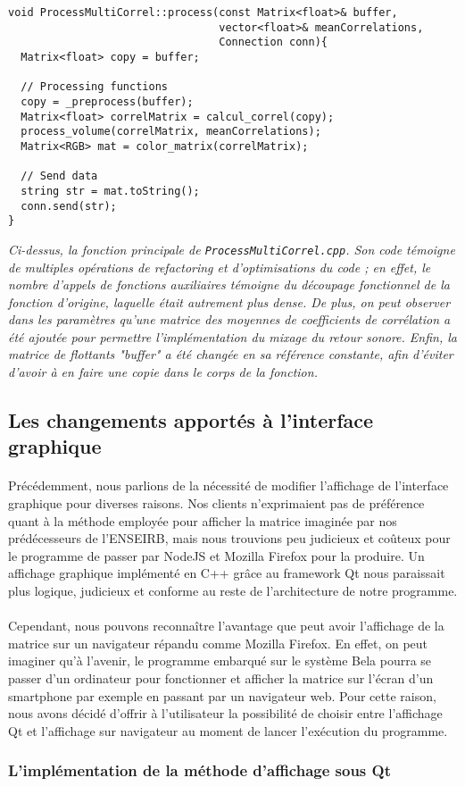 \begin{lstlisting}
void ProcessMultiCorrel::process(const Matrix<float>& buffer,
                                 vector<float>& meanCorrelations,
                                 Connection conn){
  Matrix<float> copy = buffer;

  // Processing functions
  copy = _preprocess(buffer);
  Matrix<float> correlMatrix = calcul_correl(copy);
  process_volume(correlMatrix, meanCorrelations);
  Matrix<RGB> mat = color_matrix(correlMatrix);

  // Send data
  string str = mat.toString();
  conn.send(str);
}
\end{lstlisting}
\begin{center}
  \textit{Ci-dessus, la fonction principale de
    \verb!ProcessMultiCorrel.cpp!. Son code témoigne de multiples
    opérations de refactoring et d'optimisations du code ; en effet,
    le nombre d'appels de fonctions auxiliaires témoigne du découpage
    fonctionnel de la fonction d'origine, laquelle était autrement
    plus dense. De plus, on peut observer dans les paramètres qu'une
    matrice des moyennes de coefficients de corrélation a été ajoutée
    pour permettre l'implémentation du mixage du retour sonore. Enfin,
    la matrice de flottants "buffer" a été changée en sa référence
    constante, afin d'éviter d'avoir à en faire une copie dans le
    corps de la fonction.}
  \end{center}


\subsection{Les changements apportés à l'interface graphique}
\paragraph{}
Précédemment, nous parlions de la nécessité de modifier l'affichage de
l'interface graphique pour diverses raisons. Nos clients n'exprimaient
pas de préférence quant à la méthode employée pour afficher la matrice
imaginée par nos prédécesseurs de l'ENSEIRB, mais nous trouvions peu
judicieux et coûteux pour le programme de passer par NodeJS et Mozilla
Firefox pour la produire. Un affichage graphique implémenté en C++
grâce au framework Qt nous paraissait plus logique, judicieux et
conforme au reste de l'architecture de notre programme.
\paragraph{}
Cependant, nous pouvons reconnaître l'avantage que peut avoir
l'affichage de la matrice sur un navigateur répandu comme Mozilla
Firefox. En effet, on peut imaginer qu'à l'avenir, le programme
embarqué sur le système Bela pourra se passer d'un ordinateur pour
fonctionner et afficher la matrice sur l'écran d'un smartphone par
exemple en passant par un navigateur web. Pour cette raison, nous
avons décidé d'offrir à l'utilisateur la possibilité de choisir entre
l'affichage Qt et l'affichage sur navigateur au moment de lancer
l'exécution du programme.

\subsubsection{L'implémentation de la méthode d'affichage sous Qt}
